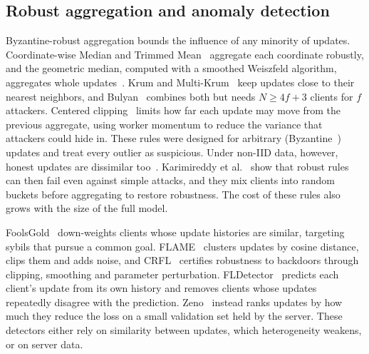 \documentclass[journal]{IEEEtran}
\begin{document}
\subsection{Robust aggregation and anomaly detection}
Byzantine-robust aggregation bounds the influence of any minority of updates. Coordinate-wise Median and Trimmed Mean~\cite{yin2018byzantine} aggregate each coordinate robustly, and the geometric median, computed with a smoothed Weiszfeld algorithm, aggregates whole updates~\cite{pillutla2022robust}. Krum and Multi-Krum~\cite{NIPS2017_f4b9ec30} keep updates close to their nearest neighbors, and Bulyan~\cite{mhamdi2018hidden} combines both but needs $N\ge4f+3$ clients for $f$ attackers. Centered clipping~\cite{karimireddy2021history} limits how far each update may move from the previous aggregate, using worker momentum to reduce the variance that attackers could hide in. These rules were designed for arbitrary (Byzantine~\cite{lamport1982byzantine}) updates and treat every outlier as suspicious. Under non-IID data, however, honest updates are dissimilar too~\cite{zhao2018noniid,li2020federated}. Karimireddy et al.~\cite{karimireddy2022bucketing} show that robust rules can then fail even against simple attacks, and they mix clients into random buckets before aggregating to restore robustness. The cost of these rules also grows with the size of the full model.

FoolsGold~\cite{fung2020limitations} down-weights clients whose update histories are similar, targeting sybils that pursue a common goal. FLAME~\cite{nguyen2022flame} clusters updates by cosine distance, clips them and adds noise, and CRFL~\cite{xie2021crfl} certifies robustness to backdoors through clipping, smoothing and parameter perturbation. FLDetector~\cite{zhang2022fldetector} predicts each client's update from its own history and removes clients whose updates repeatedly disagree with the prediction. Zeno~\cite{xie2019zeno} instead ranks updates by how much they reduce the loss on a small validation set held by the server. These detectors either rely on similarity between updates, which heterogeneity weakens, or on server data.
\end{document}
